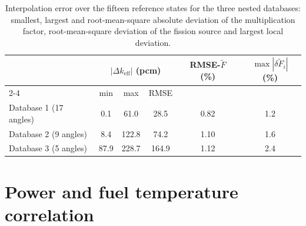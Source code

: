 \begin{table}[htbp]
  \centering
  \caption[Interpolation error for the three databases]{Interpolation error
  over the fifteen reference states for the three nested databases: smallest,
  largest and root-mean-square absolute deviation of the multiplication factor,
  root-mean-square deviation of the fission source and largest local
  deviation.}
  \label{cs:tab:dbsel}
  \begin{tabular}{lccccc}
    \toprule
    & \multicolumn{3}{c}{$|\Delta k_{\mathrm{eff}}|$ (pcm)} &
    RMSE-$\tilde F$ (\%) & $\max|\delta\tilde F_i|$ (\%) \\
    \cmidrule(lr){2-4}
    & min & max & RMSE & & \\
    \midrule
    Database 1 (17 angles) &  0.1 &  61.0 &  28.5 & 0.82 & 1.2 \\
    Database 2 (9 angles)  &  8.4 & 122.8 &  74.2 & 1.10 & 1.6 \\
    Database 3 (5 angles)  & 87.9 & 228.7 & 164.9 & 1.12 & 2.4 \\
    \bottomrule
  \end{tabular}
\end{table}

\section{Power and fuel temperature correlation}\label{cs:sec:correlation}

